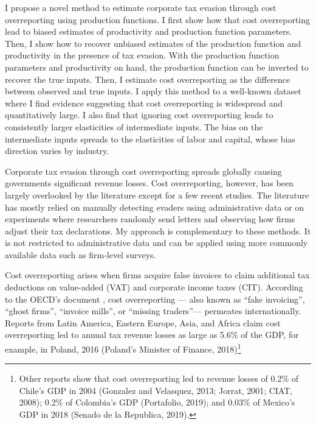 \documentclass[
  12pt]{article}
\begin{document}
I propose a novel method to estimate corporate tax evasion through cost
overreporting using production functions. I first show how that cost
overreporting lead to biased estimates of productivity and production
function parameters. Then, I show how to recover unbiased estimates of
the production function and productivity in the presence of tax evasion.
With the production function parameters and productivity on hand, the
production function can be inverted to recover the true inputs. Then, I
estimate cost overreporting as the difference between observed and true
inputs. I apply this method to a well-known dataset where I find
evidence suggesting that cost overreporting is widespread and
quantitatively large. I also find that ignoring cost overreporting leads
to consistently larger elasticities of intermediate inputs. The bias on
the intermediate inputs spreads to the elasticities of labor and
capital, whose bias direction varies by industry.

Corporate tax evasion through cost overreporting spreads globally
causing governments significant revenue losses. Cost overreporting,
however, has been largely overlooked by the literature except for a few
recent studies. The literature has mostly relied on manually detecting
evaders using administrative data or on experiments where researchers
randomly send letters and observing how firms adjust their tax
declarations. My approach is complementary to these methods. It is not
restricted to administrative data and can be applied using more commonly
available data such as firm-level surveys.

Cost overreporting arises when firms acquire false invoices to claim
additional tax deductions on value-added (VAT) and corporate income
taxes (CIT). According to the OECD's document \citet{OECD2017}, cost
overreporting --- also known as ``fake invoicing'', ``ghost firms'',
``invoice mills'', or ``missing traders''--- permeates internationally.
Reports from Latin America, Eastern Europe, Asia, and Africa claim cost
overreporting led to annual tax revenue losses as large as 5.6\% of the
GDP, for example, in Poland, 2016 (Poland's Minister of Finance,
2018)\footnote{Other reports show that cost overreporting led to revenue
  losses of 0.2\% of Chile's GDP in 2004 (Gonzalez and Velasquez, 2013;
  Jorrat, 2001; CIAT, 2008); 0.2\% of Colombia's GDP (Portafolio, 2019);
  and 0.03\% of Mexico's GDP in 2018 (Senado de la Republica, 2019).}
\end{document}
